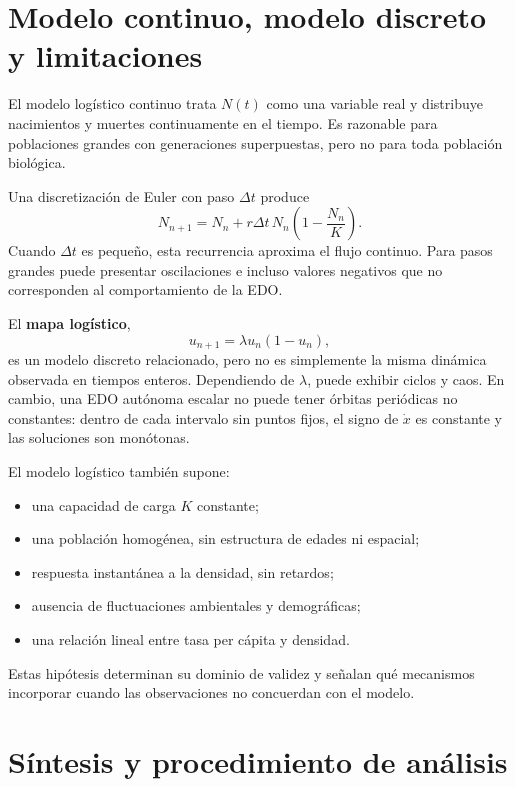 \documentclass[12pt,a4paper]{article}
\begin{document}
	\clearpage
	\section{Modelo continuo, modelo discreto y limitaciones}

	El modelo logístico continuo trata \(N(t)\) como una variable real y distribuye nacimientos y muertes continuamente en el tiempo. Es razonable para poblaciones grandes con generaciones superpuestas, pero no para toda población biológica.

	Una discretización de Euler con paso \(\Delta t\) produce
	\[
	N_{n+1}
	=
	N_n+r\Delta t\,N_n\left(1-\frac{N_n}{K}\right).
	\]
Cuando \(\Delta t\) es pequeño, esta recurrencia aproxima el flujo continuo. Para pasos grandes puede presentar oscilaciones e incluso valores negativos que no corresponden al comportamiento de la EDO.

	El \textbf{mapa logístico},
	\[
	u_{n+1}=\lambda u_n(1-u_n),
	\]
es un modelo discreto relacionado, pero no es simplemente la misma dinámica observada en tiempos enteros. Dependiendo de \(\lambda\), puede exhibir ciclos y caos. En cambio, una EDO autónoma escalar no puede tener órbitas periódicas no constantes: dentro de cada intervalo sin puntos fijos, el signo de \(\dot x\) es constante y las soluciones son monótonas.

	El modelo logístico también supone:
	\begin{itemize}[leftmargin=*]
		\item una capacidad de carga \(K\) constante;
		\item una población homogénea, sin estructura de edades ni espacial;
		\item respuesta instantánea a la densidad, sin retardos;
		\item ausencia de fluctuaciones ambientales y demográficas;
		\item una relación lineal entre tasa per cápita y densidad.
	\end{itemize}
Estas hipótesis determinan su dominio de validez y señalan qué mecanismos incorporar cuando las observaciones no concuerdan con el modelo.

	\clearpage
	\section{Síntesis y procedimiento de análisis}
\end{document}
